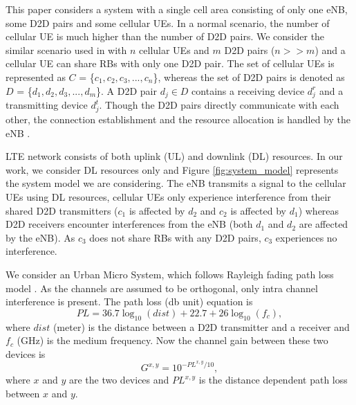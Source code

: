 \documentclass[times]{dacauth}
\begin{document}
\noindent
This paper considers a system with a single cell area consisting of only one eNB, some D2D pairs and some cellular UEs. 
In a normal scenario, the number of cellular UE is much higher than the number of D2D pairs. We consider the similar scenario used in \cite{lora, zulhasnine,  dara} with $n$ cellular UEs and $m$ D2D pairs ($n$$>>$$m$) and a cellular UE can share RBs with only one D2D pair.
The set of cellular UEs is represented as $C$ = \{$ c_{1}, c_{2}, c_{3}, ..., c_{n} $\},  
whereas the set of D2D pairs is denoted as $D$ = \{$ d_{1}, d_{2}, d_{3}, ..., d_{m} $\}. 
A D2D pair $d_{j} \in D$ contains a receiving device $d_j^r$ and a transmitting device $d_j^t$. Though the D2D pairs directly communicate with each other, the connection establishment and the resource allocation is handled by the eNB \cite{dara}. 

\smallskip
\noindent
LTE network consists of both uplink (UL) and downlink (DL) resources.
In our work, we consider DL resources only and Figure \ref{fig:system_model} represents the system model we are considering. The eNB transmits a signal to the cellular UEs using DL resources, cellular UEs only experience interference from their shared D2D transmitters ($c_1$ is affected by $d_2$ and $c_2$ is affected by $d_1$) whereas D2D receivers encounter interferences from the eNB (both $d_1$ and $d_2$ are affected by the eNB). As $c_3$ does not share RBs with any D2D pairs, $c_3$ experiences no interference.

\smallskip
\noindent
We consider an Urban Micro System, which follows Rayleigh fading path loss model \cite{lora,zulhasnine, dara}. As the channels are assumed to be orthogonal, only intra channel interference is present. The path loss (db unit) equation is 
\begin{equation}
	PL = 36.7\log_{10}(dist)+22.7+26\log_{10}(f_{c}),
\end{equation}
where $dist$ (meter) is the distance between a D2D transmitter and a receiver and $f_{c}$ (GHz) is the medium frequency.
Now the channel gain between these two devices is 
\begin{equation}
	G^{x,y} = 10^{-PL^{x,y}/10},
\end{equation}
where $x$ and $y$ are the two devices and $PL^{x,y}$ is the distance dependent path loss between $x$ and $y$.

\smallskip
\end{document}
